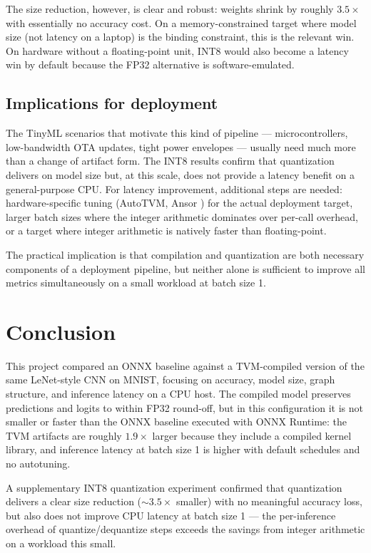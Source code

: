 \documentclass[fleqn,10pt]{olplainarticle}
\begin{document}
The size reduction, however, is clear and robust: weights shrink by roughly $3.5\times$ with essentially no accuracy cost. On a memory-constrained target where model size (not latency on a laptop) is the binding constraint, this is the relevant win. On hardware without a floating-point unit, INT8 would also become a latency win by default because the FP32 alternative is software-emulated.

\subsection{Implications for deployment}

The TinyML scenarios that motivate this kind of pipeline --- microcontrollers, low-bandwidth OTA updates, tight power envelopes --- usually need much more than a change of artifact form. The INT8 results confirm that quantization delivers on model size but, at this scale, does not provide a latency benefit on a general-purpose CPU. For latency improvement, additional steps are needed: hardware-specific tuning (AutoTVM, Ansor \cite{zheng2020ansor}) for the actual deployment target, larger batch sizes where the integer arithmetic dominates over per-call overhead, or a target where integer arithmetic is natively faster than floating-point.

The practical implication is that compilation and quantization are both necessary components of a deployment pipeline, but neither alone is sufficient to improve all metrics simultaneously on a small workload at batch size 1.

\section{Conclusion}

This project compared an ONNX baseline against a TVM-compiled version of the same LeNet-style CNN on MNIST, focusing on accuracy, model size, graph structure, and inference latency on a CPU host. The compiled model preserves predictions and logits to within FP32 round-off, but in this configuration it is not smaller or faster than the ONNX baseline executed with ONNX Runtime: the TVM artifacts are roughly $1.9\times$ larger because they include a compiled kernel library, and inference latency at batch size 1 is higher with default schedules and no autotuning.

A supplementary INT8 quantization experiment confirmed that quantization delivers a clear size reduction (${\sim}3.5\times$ smaller) with no meaningful accuracy loss, but also does not improve CPU latency at batch size 1 --- the per-inference overhead of quantize/dequantize steps exceeds the savings from integer arithmetic on a workload this small.
\end{document}
